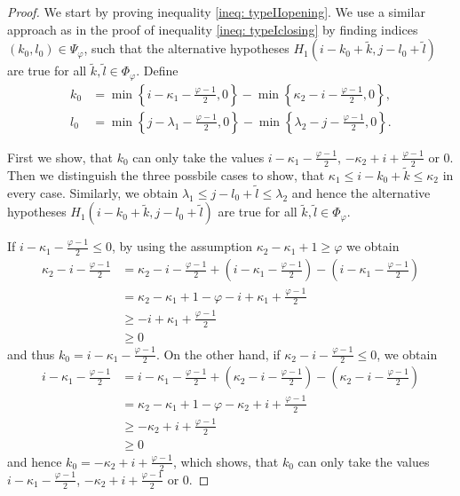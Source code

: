 \documentclass[a4paper,12pt]{article}
\theoremstyle{plain}
\theoremstyle{definition}
\begin{document}
\begin{proof}
	We start by proving inequality \eqref{ineq: typeIIopening}. We use a similar approach as in the proof of inequality \eqref{ineq: typeIclosing} by finding indices $(k_0, l_0) \in \Psi_\varphi$, such that the alternative hypotheses $H_1(i - k_0 + \tilde{k}, j - l_0 + \tilde{l})$ are true for all $\tilde{k}, \tilde{l} \in \Phi_\varphi$. Define
	\begin{align*}
		k_0 &= \min \left\{ i - \kappa_1 - \frac{\varphi - 1}{2}, 0 \right\} - \min \left\{ \kappa_2 - i - \frac{\varphi - 1}{2}, 0 \right\}, \\
		l_0 &= \min \left\{ j - \lambda_1 - \frac{\varphi - 1}{2}, 0 \right\} - \min \left\{ \lambda_2 - j - \frac{\varphi - 1}{2}, 0 \right\}.
	\end{align*}
	
	First we show, that $k_0$ can only take the values $i - \kappa_1 - \frac{\varphi - 1}{2}$, $- \kappa_2 + i + \frac{\varphi - 1}{2}$ or $0$. Then we distinguish the three possbile cases to show, that $\kappa_1 \leq i - k_0 + \tilde{k} \leq \kappa_2$ in every case. Similarly, we obtain $\lambda_1 \leq j - l_0 + \tilde{l} \leq \lambda_2$ and hence the alternative hypotheses $H_1(i - k_0 + \tilde{k}, j - l_0 + \tilde{l})$ are true for all $\tilde{k}, \tilde{l} \in \Phi_\varphi$.
	
	If $i - \kappa_1 - \frac{\varphi - 1}{2} \leq 0$, by using the assumption $\kappa_2 - \kappa_1 + 1 \geq \varphi$ we obtain
	\begin{align*}
		\kappa_2 - i - \frac{\varphi - 1}{2} &= \kappa_2 - i - \frac{\varphi - 1}{2} + \left( i - \kappa_1 - \frac{\varphi - 1}{2} \right) - \left( i - \kappa_1 - \frac{\varphi - 1}{2} \right) \\
		&= \kappa_2 - \kappa_1 + 1 - \varphi - i + \kappa_1 + \frac{\varphi - 1}{2} \\
		&\geq - i + \kappa_1 + \frac{\varphi - 1}{2} \\
		&\geq 0
	\end{align*}
	and thus $k_0 = i - \kappa_1 - \frac{\varphi - 1}{2}$. On the other hand, if $\kappa_2 - i - \frac{\varphi - 1}{2} \leq 0$, we obtain
	\begin{align*}
		i - \kappa_1 - \frac{\varphi - 1}{2} &= i - \kappa_1 - \frac{\varphi - 1}{2} + \left( \kappa_2 - i - \frac{\varphi - 1}{2} \right) - \left( \kappa_2 - i - \frac{\varphi - 1}{2} \right) \\
		&= \kappa_2 - \kappa_1 + 1 - \varphi - \kappa_2 + i + \frac{\varphi - 1}{2} \\
		&\geq - \kappa_2 + i + \frac{\varphi - 1}{2} \\
		&\geq 0
	\end{align*}
	and hence $k_0 = - \kappa_2 + i + \frac{\varphi - 1}{2}$, which shows, that $k_0$ can only take the values $i - \kappa_1 - \frac{\varphi - 1}{2}$, $- \kappa_2 + i + \frac{\varphi - 1}{2}$ or $0$.
	

\end{proof}
\end{document}
